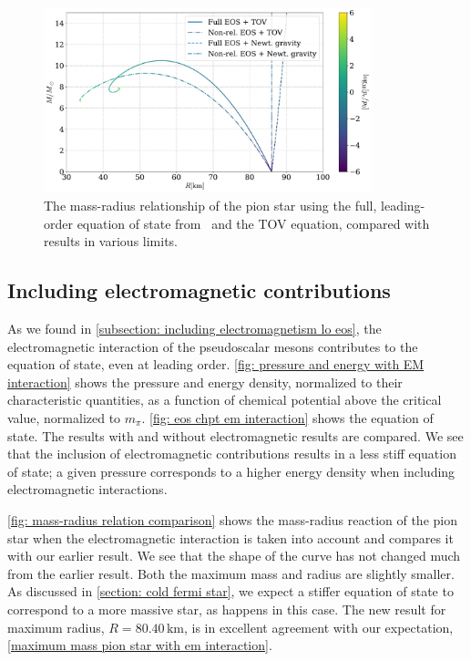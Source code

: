 \begin{figure}[p]
    \centering
    \includegraphics[width=0.85\textwidth]{../scripts/figurer/pion_star/mass_radius_comparison.pdf}
    \caption{
        The mass-radius relationship of the pion star using the full, leading-order equation of state from \chpt\, and the TOV equation, compared with results in various limits.
        }
        \label{fig: mass-radius relation pion star comparison}
\end{figure}



\FloatBarrier

\subsection{Including electromagnetic contributions}

As we found in \autoref{subsection: including electromagnetism lo eos}, the electromagnetic interaction of the pseudoscalar mesons contributes to the equation of state, even at leading order.
\autoref{fig: pressure and energy with EM interaction} shows the pressure and energy density, normalized to their characteristic quantities, as a function of chemical potential above the critical value, normalized to $m_\pi$.
\autoref{fig: eos chpt em interaction} shows the equation of state.
The results with and without electromagnetic results are compared.
We see that the inclusion of electromagnetic contributions results in a less stiff equation of state; a given pressure corresponds to a higher energy density when including electromagnetic interactions.

\autoref{fig: mass-radius relation comparison} shows the mass-radius reaction of the pion star when the electromagnetic interaction is taken into account and compares it with our earlier result.
We see that the shape of the curve has not changed much from the earlier result. 
Both the maximum mass and radius are slightly smaller.
As discussed in \autoref{section: cold fermi star}, we expect a stiffer equation of state to correspond to a more massive star, as happens in this case.
The new result for maximum radius, $R = 80.40 \, \text{km}$, is in excellent agreement with our expectation, \autoref{maximum mass pion star with em interaction}.



